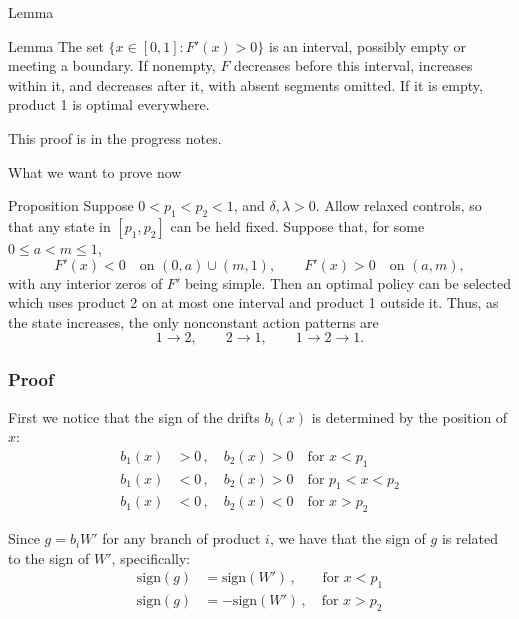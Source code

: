\documentclass[10pt]{beamer}
\begin{document}
\begin{frame}{Lemma}
    \begin{block}{Lemma}
        The set $\{x\in[0,1]:F'(x)>0\}$ is an interval, possibly empty or
        meeting a boundary. If nonempty, $F$ decreases before this interval,
        increases within it, and decreases after it, with absent segments omitted.
        If it is empty, product 1 is optimal everywhere.
    \end{block}
    This proof is in the progress notes.
\end{frame}

\begin{frame}{What we want to prove now}
    \begin{block}{Proposition}
        Suppose $0<p_1<p_2<1$, and $\delta,\lambda>0$.
        Allow relaxed controls, so that any state in $[p_1,p_2]$ can be held fixed.
        Suppose that, for some $0\leq a<m\leq 1$,
        \begin{equation}
            F'(x)<0 \quad \text{on } (0,a)\cup(m,1),
            \qquad
            F'(x)>0 \quad \text{on } (a,m),
        \end{equation}
        with any interior zeros of $F'$ being simple. Then an optimal policy can be
        selected which uses product 2 on at most one interval and product 1 outside it.
        Thus, as the state increases, the only nonconstant action patterns are
        \begin{equation}
            1\to2,\qquad 2\to1,\qquad 1\to2\to1.
        \end{equation}
    \end{block}
\end{frame}
\begin{frame}
    \frametitle{Proof}
    First we notice that the sign of the drifts $b_i(x)$ is determined by the position of $x$:
    \begin{align}
        b_1(x) &>0 \,,\quad b_2(x)>0 \quad \text{for } x<p_1 \\
        b_1(x) &<0 \,,\quad b_2(x)>0 \quad \text{for } p_1< x <p_2 \\
        b_1(x) &<0 \,,\quad b_2(x)<0 \quad \text{for } x > p_2  
    \end{align} 

    Since $g = b_i W'$ for any branch of product $i$, we have that the sign of $g$ is related to the sign of $W'$, specifically:
    \begin{align}
        \text{sign}(g) &= \text{sign}(W') \,,\,\,\,\,\,\quad \text{for } x<p_1 \\
        \text{sign}(g) &= -\text{sign}(W') \,,\quad \text{for } x>p_2
    \end{align} 
\end{frame}
\end{document}
